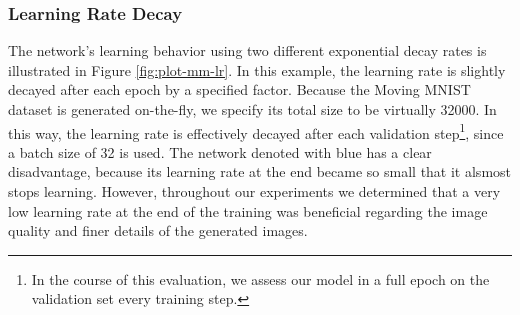 \subsubsection*{Learning Rate Decay}

The network's learning behavior using two different exponential decay rates is illustrated in Figure \ref{fig:plot-mm-lr}. In this example, the learning rate is slightly decayed after each epoch by a specified factor. Because the Moving MNIST dataset is generated on-the-fly, we specify its total size to be virtually \num{32000}. In this way, the learning rate is effectively decayed after each validation step\footnote{In the course of this evaluation, we assess our model in a full epoch on the validation set every  training step.}, since a batch size of \num{32} is used. The network denoted with blue has a clear disadvantage, because its learning rate at the end became so small that it alsmost stops learning. However, throughout our experiments we determined that a very low learning rate at the end of the training was beneficial regarding the image quality and finer details of the generated images.

